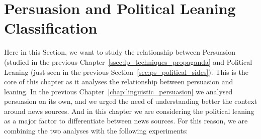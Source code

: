 

\section{\statusgreen Persuasion and Political Leaning Classification}
\label{sec:ps_prop_and_leaning}

Here in this Section, we want to study the relationship between Persuasion (studied in the previous Chapter~\ref{ssec:lp_techniques_propaganda} and Political Leaning (just seen in the previous Section~\ref{sec:ps_political_sides}).
This is the core of this chapter as it analyses the relationship between persuasion and leaning. In the previous Chapter~\ref{chap:linguistic_persuasion} we analysed persuasion on its own, and we urged the need of understanding better the context around news sources. And in this chapter we are considering the political leaning as a major factor to differentiate between news sources.
For this reason, we are combining the two analyses with the following experiments:

